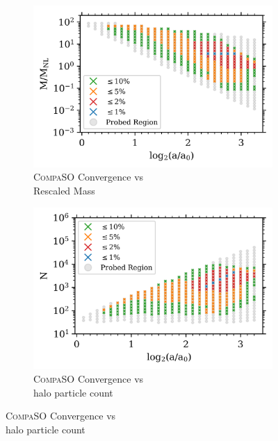 \begin{figure}
\centering
\begin{subfigure}{.49\textwidth}
\centering
\includegraphics[width=\textwidth]{Ch3_Self_Sim/Paper_Plots_gtr20/CompaSO15_mean_past_joyce_mah_M200c_gtr20_FW_WW5_M_M_NL_vs_a_convergence_MT2_UVM_min_1000.png}
\caption{\textsc{CompaSO} Convergence vs\\ Rescaled Mass}
\end{subfigure}
\hfil
\begin{subfigure}{.49\textwidth}
\centering
\includegraphics[width=\textwidth]{Ch3_Self_Sim/Paper_Plots_gtr20/CompaSO_n15_mean_past_joyce_mah_M200c_gtr20_FW_WW5_N_vs_a_convergence_MT2_UVM_min_1000.png}
\caption{\textsc{CompaSO} Convergence vs\\ halo particle count}
\end{subfigure}

\end{figure}
